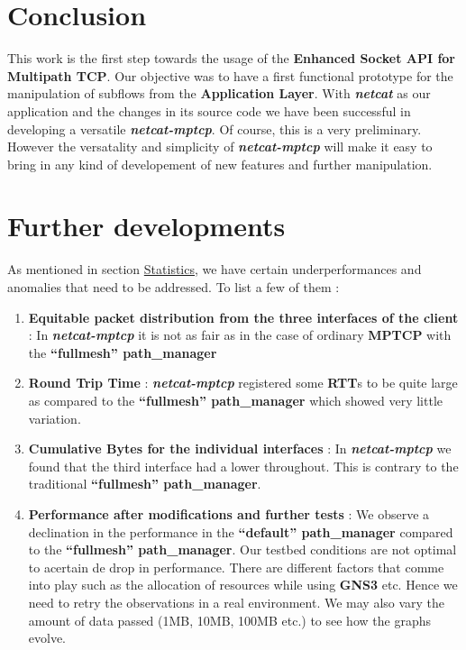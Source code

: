 \documentclass[a4paper,11pt]{article}
\begin{document}
	\clearpage
	\section{Conclusion}
		\label{sec:conclusion}
	 	This work is the first step towards the usage of the \textbf{Enhanced Socket API for Multipath TCP}. Our objective was to have a first functional prototype for the manipulation of subflows from the \textbf{Application Layer}. With \textbf{\emph{netcat}} as our application and the changes in its source code we have been successful in developing a versatile \textbf{\emph{netcat-mptcp}}. Of course, this is a very preliminary. However the versatality and simplicity of \textbf{\emph{netcat-mptcp}} will make it easy to bring in any kind of developement of new features and further manipulation.
		 	
		 
	\section{Further developments}
		\label{sec:furtherdevelopment}
		As mentioned in section \hyperref[subsec:statistics]{Statistics}, we have certain underperformances and anomalies that need to be addressed. To list a few of them :

		\begin{enumerate}
			\item \textbf{Equitable packet distribution from the three interfaces of the client} : In \textbf{\emph{netcat-mptcp}} it is not as fair as in the case of ordinary \textbf{MPTCP} with the \textbf{``fullmesh'' path\_manager}
			\item \textbf{Round Trip Time} : \textbf{\emph{netcat-mptcp}} registered some \textbf{RTT}s to be quite large as compared to the \textbf{``fullmesh'' path\_manager} which showed very little variation.
			\item \textbf{Cumulative Bytes for the individual interfaces} : In \textbf{\emph{netcat-mptcp}} we found that the third interface had a lower throughout. This is contrary to the traditional \textbf{``fullmesh'' path\_manager}.
			\item \textbf{Performance after modifications and further tests} : We observe a declination in the performance in the \textbf{``default'' path\_manager} compared to the \textbf{``fullmesh'' path\_manager}. Our testbed conditions are not optimal to acertain de drop in performance. There are different factors that comme into play such as the allocation of resources while using \textbf{GNS3} etc. Hence we need to retry the observations in a real environment. We may also vary the amount of data passed (1MB, 10MB, 100MB etc.) to see how the graphs evolve.
		\end{enumerate}
\end{document}
